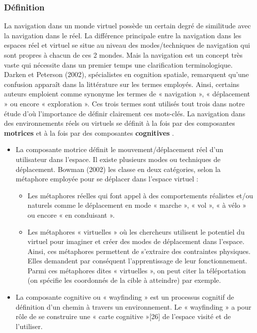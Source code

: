 \subsubsection{Définition}

La navigation dans un monde virtuel possède un certain degré de similitude avec la navigation dans le réel. La différence principale entre la navigation dans les espaces réel et virtuel se situe au niveau des modes/techniques de navigation qui sont propres à chacun de ces 2 mondes. 
Mais la navigation est un concept très vaste qui nécessite dans un premier temps une clarification terminologique. Darken et Peterson (2002), spécialistes en cognition spatiale, remarquent qu'une confusion apparaît dans la littérature sur les termes employés. Ainsi, certains auteurs emploient comme synonyme les termes de « navigation », « déplacement » ou encore « exploration ». Ces trois termes sont utilisés tout trois dans notre étude d’où l’importance de définir clairement ces mots-clés. 
La navigation dans des environnements réels ou virtuels se définit à la fois par des composantes \textbf{motrices} et à la fois par des composantes \textbf{cognitives} \cite{bowman_doug_a_3d_2002}.

\begin{itemize}
  \item La composante motrice définit le mouvement/déplacement réel d’un utilisateur dans l’espace. Il existe plusieurs modes ou techniques de déplacement. Bowman (2002) les classe en deux catégories, selon la métaphore employée pour se déplacer dans l’espace virtuel :
    \begin{itemize}
      \item Les métaphores réelles qui font appel à des comportements réalistes et/ou naturels comme le déplacement en mode « marche », « vol », « à vélo » ou encore « en conduisant ».
      \item Les métaphores « virtuelles » où les chercheurs utilisent le potentiel du virtuel pour imaginer et créer des modes de déplacement dans l’espace. Ainsi, ces métaphores permettent de s’extraire des contraintes physiques. Elles demandent par conséquent l’apprentissage de leur fonctionnement. Parmi ces métaphores dites « virtuelles », on peut citer la téléportation (on spécifie les coordonnés de la cible à atteindre) par exemple.
    \end{itemize}
  \item La composante cognitive ou « wayfinding » est un processus cognitif de définition d’un chemin à travers un environnement. Le « wayfinding » a pour rôle de se construire une « carte cognitive »[26] de l’espace visité et de l’utiliser.
\end{itemize}

